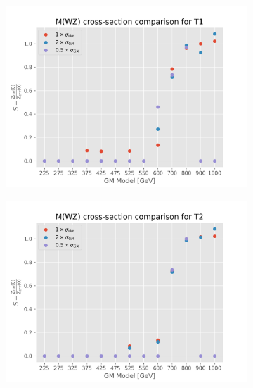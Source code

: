\documentclass[../Bachelorarbeit.tex]{subfiles}
\begin{document}
\begin{figure}[h]
\begin{subfigure}{0.45\textwidth}
        \includegraphics[width=\textwidth]{Plots/gm_relevanze/MWZ_comparision_T1.png}
        \caption{}
    \end{subfigure}
    \begin{subfigure}{0.45\textwidth}
        \includegraphics[width=\textwidth]{Plots/gm_relevanze/MWZ_comparision_T2.png}
        \caption{}
    \end{subfigure}
    \caption{}
\end{figure}
\end{document}
